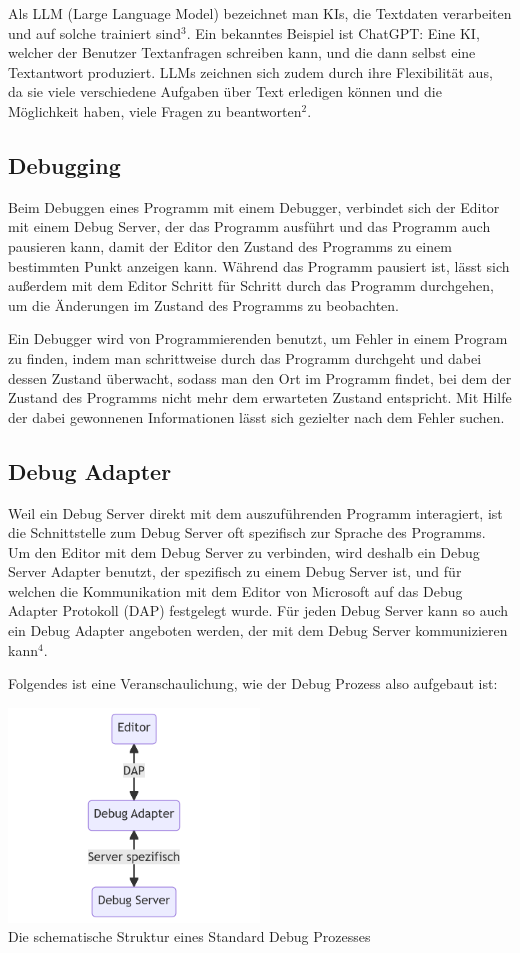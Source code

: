 \documentclass[a4paper,12pt,ngerman]{scrartcl}
\begin{document}
Als LLM (Large Language Model) bezeichnet man KIs, die Textdaten verarbeiten und auf solche trainiert sind$^3$. Ein bekanntes Beispiel ist ChatGPT: Eine KI, welcher der Benutzer Textanfragen schreiben kann, und die dann selbst eine Textantwort produziert. LLMs zeichnen sich zudem durch ihre Flexibilität aus, da sie viele verschiedene Aufgaben über Text erledigen können und die Möglichkeit haben, viele Fragen zu beantworten$^2$.

\subsection{Debugging}

Beim Debuggen eines Programm mit einem Debugger, verbindet sich der Editor mit einem Debug Server, der das Programm ausführt und das Programm auch pausieren kann, damit der Editor den Zustand des Programms zu einem bestimmten Punkt anzeigen kann. Während das Programm pausiert ist, lässt sich außerdem mit dem Editor Schritt für Schritt durch das Programm durchgehen, um die Änderungen im Zustand des Programms zu beobachten.

Ein Debugger wird von Programmierenden benutzt, um Fehler in einem Program zu finden, indem man schrittweise durch das Programm durchgeht und dabei dessen Zustand überwacht, sodass man den Ort im Programm findet, bei dem der Zustand des Programms nicht mehr dem erwarteten Zustand entspricht. Mit Hilfe der dabei gewonnenen Informationen lässt sich gezielter nach dem Fehler suchen. 

\subsection{Debug Adapter}

Weil ein Debug Server direkt mit dem auszuführenden Programm interagiert, ist die Schnittstelle zum Debug Server oft spezifisch zur Sprache des Programms. Um den Editor mit dem Debug Server zu verbinden, wird deshalb ein Debug Server Adapter benutzt, der spezifisch zu einem Debug Server ist, und für welchen die Kommunikation mit dem Editor von Microsoft auf das Debug Adapter Protokoll (DAP) festgelegt wurde. Für jeden Debug Server kann so auch ein Debug Adapter angeboten werden, der mit dem Debug Server kommunizieren kann$^4$.

Folgendes ist eine Veranschaulichung, wie der Debug Prozess also aufgebaut ist:

\begin{center}
	\includegraphics[width=0.5\textwidth]{debugger}\\
	\small{Die schematische Struktur eines Standard Debug Prozesses}
\end{center}
\end{document}
